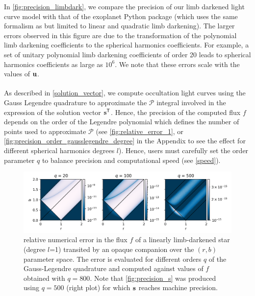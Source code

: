 \documentclass[modern]{aastex631}
\begin{document}
In \autoref{fig:precision_limbdark}, we compare the precision of our limb darkened light curve model with that of the \textsf{exoplanet} Python package (which uses the same formalism as \cite{Agol2020} but limited to linear and quadratic limb darkening). The larger errors observed in this figure are due to the transformation of the polynomial limb darkening coefficients to the spherical harmonics coefficients. For example, a set of unitary polynomial limb darkening coefficients of order 20 leads to spherical harmonics coefficients as large as $10^6$. We note that these errors scale with the values of ${\mathbf{u}}$.\\\\
As described in \autoref{solution_vector}, we compute occultation light curves using the Gauss Legendre quadrature to approximate the $\mathcal{P}$ integral involved in the expression of the solution vector ${\mathbf{s}}^\mathsf{T}$. Hence, the precision of the computed flux $f$ depends on the order of the Legendre polynomial which defines the number of points used to approximate $\mathcal{P}$ (see \autoref{fig:relative_error_1}, or  \autoref{fig:precision_order_gausslegendre_degree} in the Appendix to see the effect for different spherical harmonics degrees $l$). Hence, users must carefully set the order parameter $q$ to balance precision and computational speed (see \autoref{speed}).
\begin{figure}[H]
    \begin{center}
        \includegraphics[width=\textwidth]{../workflows/precision/figures/br_error.png}
        \caption{relative numerical error in the flux $f$ of a linearly limb-darkened star (degree $l$=1) transited by an opaque companion over the $(r, b)$ parameter space. The error is evaluated for different orders $q$ of the Gauss-Legendre quadrature and computed against values of $f$ obtained with $q=800$. Note that \autoref{fig:precision_s} was produced using $q=500$ (right plot) for which ${\mathbf{s}}$ reaches machine precision. }
        \label{fig:relative_error_1}
    \end{center}
\end{figure}
\end{document}

